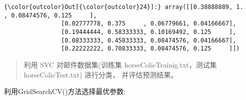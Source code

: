 \documentclass[11pt]{article}
\begin{document}
\begin{Verbatim}[commandchars=\\\{\}]
{\color{outcolor}Out[{\color{outcolor}24}]:} array([[0.38888889, 1.        , 0.08474576, 0.125     ],
                [0.02777778, 0.375     , 0.06779661, 0.04166667],
                [0.19444444, 0.58333333, 0.10169492, 0.125     ],
                [0.08333333, 0.45833333, 0.08474576, 0.04166667],
                [0.22222222, 0.70833333, 0.08474576, 0.125     ]])
\end{Verbatim}
            
    \begin{quote}
利用 SVC 对邮件数据集(训练集 horseColicTrainig.txt，测试集
horseColicTest.txt) 进行分类， 并评估预测结果。
\end{quote}

    利用GridSearchCV()方法选择最优参数:
\end{document}
